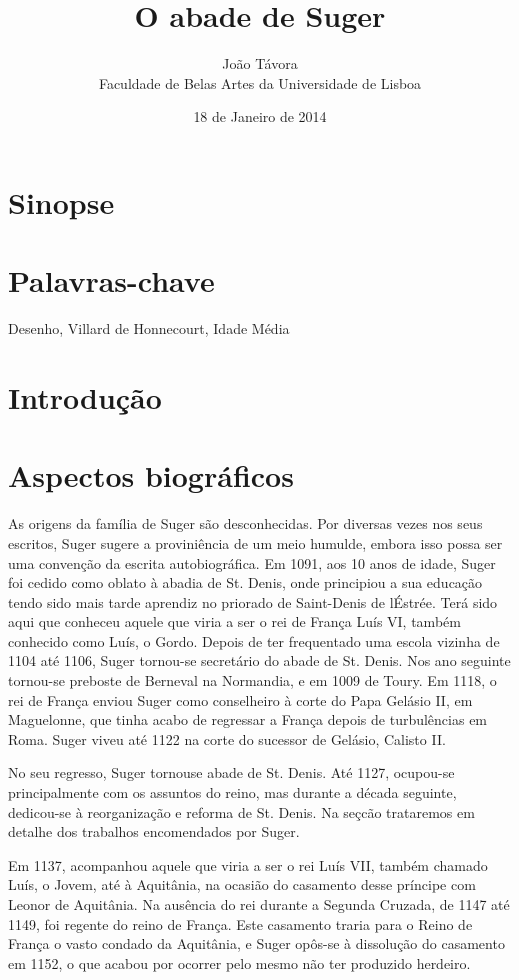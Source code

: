 \documentclass{article}
\title{O abade de Suger}
\date{18 de Janeiro de 2014}
\author{João Távora \\Faculdade de Belas Artes da Universidade de Lisboa}
\begin{document}
\maketitle

\section{Sinopse}

\section{Palavras-chave}

Desenho, Villard de Honnecourt, Idade Média

\section{Introdução}

\section{Aspectos biográficos}

As origens da família de Suger são desconhecidas. Por diversas vezes
nos seus escritos, Suger sugere a proviniência de um meio humulde,
embora isso possa ser uma convenção da escrita autobiográfica. Em
1091, aos 10 anos de idade, Suger foi cedido como oblato à abadia de
St. Denis, onde principiou a sua educação tendo sido mais tarde
aprendiz no priorado de Saint-Denis de lÉstrée. Terá sido aqui que
conheceu aquele que viria a ser o rei de França Luís VI, também
conhecido como Luís, o Gordo. Depois de ter frequentado uma escola
vizinha de 1104 até 1106, Suger tornou-se secretário do abade de
St. Denis. Nos ano seguinte tornou-se preboste de Berneval na
Normandia, e em 1009 de Toury. Em 1118, o rei de França enviou Suger
como conselheiro à corte do Papa Gelásio II, em Maguelonne, que tinha
acabo de regressar a França depois de turbulências em Roma. Suger
viveu até 1122 na corte do sucessor de Gelásio, Calisto II.

No seu regresso, Suger tornouse abade de St. Denis. Até 1127,
ocupou-se principalmente com os assuntos do reino, mas durante a
década seguinte, dedicou-se à reorganização e reforma de St. Denis. Na
seçcão  trataremos em detalhe dos trabalhos encomendados
por Suger.

Em 1137, acompanhou aquele que viria a ser o rei Luís VII, também
chamado Luís, o Jovem, até à Aquitânia, na ocasião do casamento desse
príncipe com Leonor de Aquitânia. Na ausência do rei durante a Segunda
Cruzada, de 1147 até 1149, foi regente do reino de França. Este
casamento traria para o Reino de França o vasto condado da Aquitânia,
e Suger opôs-se à dissolução do casamento em 1152, o que acabou por
ocorrer pelo mesmo não ter produzido herdeiro.
\end{document}
